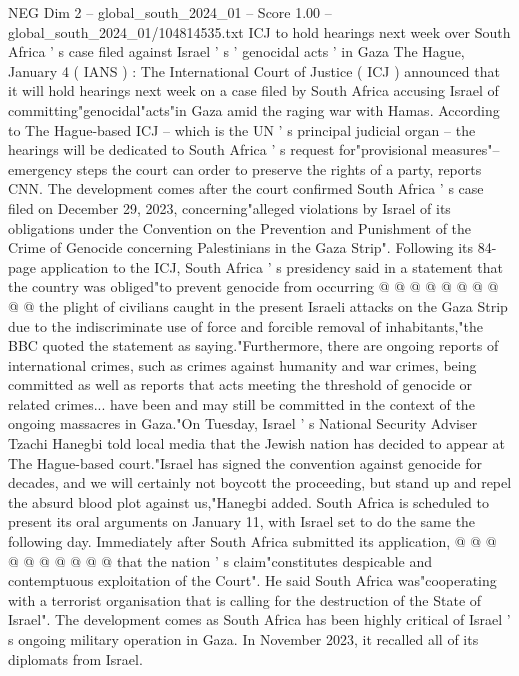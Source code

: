 \begin{textsample}{NEG Dim 2 – global\_south\_2024\_01 – Score 1.00 – global\_south\_2024\_01/104814535.txt}  \label{ex:f2_neg_347}
ICJ to hold hearings next week over South Africa ' s case filed against Israel ' s ' genocidal acts ' in Gaza The Hague, January 4 ( IANS ) : The International Court of Justice ( ICJ ) announced that it will hold hearings next week on a case filed by South Africa accusing Israel of committing"genocidal"acts"in Gaza amid the raging war with Hamas.
According to The Hague-based ICJ -- which is the UN ' s principal judicial organ -- the hearings will be dedicated to South Africa ' s request for"provisional measures"-- emergency steps the court can order to preserve the rights of a party, reports CNN.
The development comes after the court confirmed South Africa ' s case filed on December 29, 2023, concerning"alleged violations by Israel of its obligations under the Convention on the Prevention and Punishment of the Crime of Genocide concerning Palestinians in the Gaza Strip".
Following its 84-page application to the ICJ, South Africa ' s presidency said in a statement that the country was obliged"to prevent genocide from occurring @ @ @ @ @ @ @ @ @ @ the plight of civilians caught in the present Israeli attacks on the Gaza Strip due to the indiscriminate use of force and forcible removal of inhabitants,"the BBC quoted the statement as saying."Furthermore, there are ongoing reports of international crimes, such as crimes against humanity and war crimes, being committed as well as reports that acts meeting the threshold of genocide or related crimes... have been and may still be committed in the context of the ongoing massacres in Gaza."On Tuesday, Israel ' s National Security Adviser Tzachi Hanegbi told local media that the Jewish nation has decided to appear at The Hague-based court."Israel has signed the convention against genocide for decades, and we will certainly not boycott the proceeding, but stand up and repel the absurd blood plot against us,"Hanegbi added.
South Africa is scheduled to present its oral arguments on January 11, with Israel set to do the same the following day.
Immediately after South Africa submitted its application, @ @ @ @ @ @ @ @ @ @ that the nation ' s claim"constitutes despicable and contemptuous exploitation of the Court".
He said South Africa was"cooperating with a terrorist organisation that is calling for the destruction of the State of Israel".
The development comes as South Africa has been highly critical of Israel ' s ongoing military operation in Gaza.
In November 2023, it recalled all of its diplomats from Israel.

\end{textsample}
